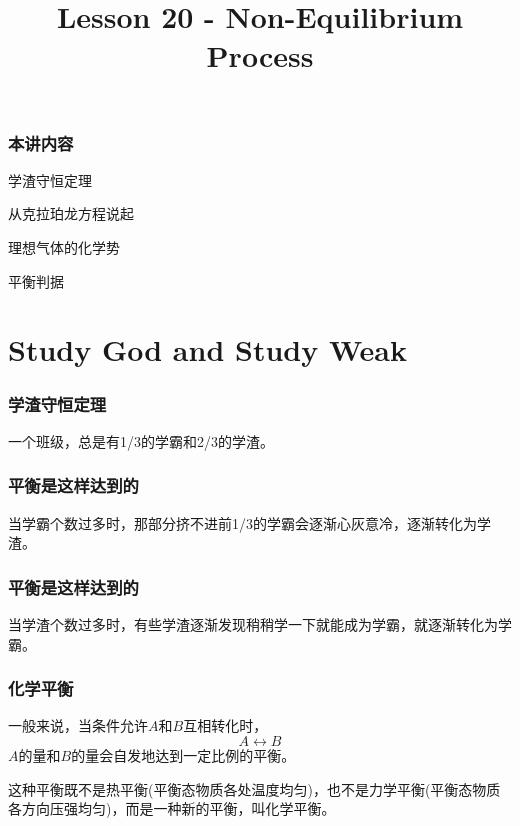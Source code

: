 \documentclass[CJK,13pt]{beamer}
\title{Lesson 20 - Non-Equilibrium Process}
\author{}
\date{}
\begin{document}
\bch
  

\begin{frame}
\frametitle{本讲内容}

\bitem
\item{学渣守恒定理}
\item{从克拉珀龙方程说起}
\item{理想气体的化学势}
\item{平衡判据}
\eitem
  
\end{frame}

\section{Study God and Study Weak}

\begin{frame}
  \frametitle{学渣守恒定理}

  一个班级，总是有1/3的学霸和2/3的学渣。

  
\end{frame}

\begin{frame}
  \frametitle{平衡是这样达到的}


  当学霸个数过多时，那部分挤不进前1/3的学霸会逐渐心灰意冷，逐渐转化为学渣。


\end{frame}

\begin{frame}
  \frametitle{平衡是这样达到的}
  
  当学渣个数过多时，有些学渣逐渐发现稍稍学一下就能成为学霸，就逐渐转化为学霸。
  
\end{frame}


\begin{frame}
  \frametitle{化学平衡}

  一般来说，当条件允许$A$和$B$互相转化时，
  $$A\leftrightarrow B$$
  $A$的量和$B$的量会自发地达到一定比例的平衡。

  这种平衡既不是{\blue 热平衡}(平衡态物质各处温度均匀)，也不是{\blue 力学平衡}(平衡态物质各方向压强均匀)，而是一种新的平衡，叫{\blue 化学平衡}。

\end{frame}
\end{document}
